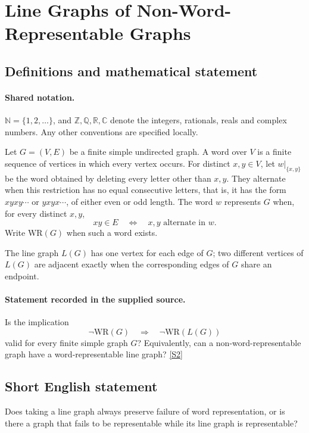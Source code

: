 \documentclass[11pt]{article}
\newcommand{\sref}[2]{\hyperlink{source:#1:#2}{[S#2]}}
\begin{document}
\section{Line Graphs of Non-Word-Representable Graphs}\label{statement}

\subsection{Definitions and mathematical statement}

\paragraph{Shared notation.}$\mathbb N=\{1,2,\ldots\}$, and $\mathbb Z,\mathbb Q,\mathbb R,\mathbb C$ denote the integers, rationals, reals and complex numbers. Any other conventions are specified locally.


Let $G=(V,E)$ be a finite simple undirected graph. A word over $V$ is a finite sequence of vertices in which every vertex occurs. For distinct $x,y\in V$, let $w|_{\{x,y\}}$ be the word obtained by deleting every letter other than $x,y$. They alternate when this restriction has no equal consecutive letters, that is, it has the form $xyxy\cdots$ or $yxyx\cdots$, of either even or odd length. The word $w$ represents $G$ when, for every distinct $x,y$,
\[
 xy\in E\quad\Longleftrightarrow\quad x,y\text{ alternate in }w.
\]
Write $\mathrm{WR}(G)$ when such a word exists.

The line graph $L(G)$ has one vertex for each edge of $G$; two different vertices of $L(G)$ are adjacent exactly when the corresponding edges of $G$ share an endpoint.
\paragraph{Statement recorded in the supplied source.}
Is the implication
\[
 \neg\mathrm{WR}(G)\quad\Longrightarrow\quad\neg\mathrm{WR}(L(G))
\]
valid for every finite simple graph $G$? Equivalently, can a non-word-representable graph have a word-representable line graph? \sref{statement}{2}
\subsection{Short English statement}
Does taking a line graph always preserve failure of word representation, or is there a graph that fails to be representable while its line graph is representable?
\end{document}
